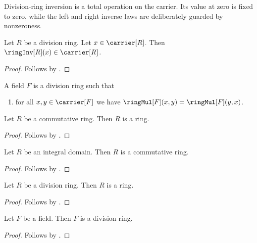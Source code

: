 Division-ring inversion is a total operation on the carrier.  Its value at
zero is fixed to zero, while the left and right inverse laws are deliberately
guarded by nonzeroness.

\begin{proposition}\label{division_ring_inverse_type}
    Let $R$ be a division ring.
    Let $x\in\carrier[R]$.
    Then $\ringInv[R](x)\in\carrier[R]$.
\end{proposition}
\begin{proof}
    Follows by .
\end{proof}

\begin{struct}\label{field}
    A field $F$ is a division ring such that
    \begin{enumerate}
        \item\label{field_mul_commutative}
            for all $x,y\in\carrier[F]$ we have
                $\ringMul[F](x,y)=\ringMul[F](y,x)$.
    \end{enumerate}
\end{struct}

\begin{corollary}\label{commutative_ring_is_ring}
    Let $R$ be a commutative ring.
    Then $R$ is a ring.
\end{corollary}
\begin{proof}
    Follows by .
\end{proof}

\begin{corollary}\label{integral_domain_is_commutative_ring}
    Let $R$ be an integral domain.
    Then $R$ is a commutative ring.
\end{corollary}
\begin{proof}
    Follows by .
\end{proof}

\begin{corollary}\label{division_ring_is_ring}
    Let $R$ be a division ring.
    Then $R$ is a ring.
\end{corollary}
\begin{proof}
    Follows by .
\end{proof}

\begin{corollary}\label{field_is_division_ring}
    Let $F$ be a field.
    Then $F$ is a division ring.
\end{corollary}
\begin{proof}
    Follows by .
\end{proof}

